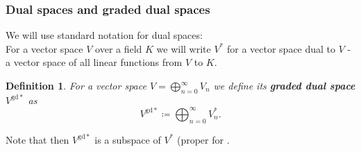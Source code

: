 \documentclass[a4paper, 12pt]{report}
\newtheorem{definition}{Definition}
\begin{document}
\subsubsection{Dual spaces and graded dual spaces }
We will use standard notation for dual spaces: \\ 
For a vector space $V$ over a field $K$ we will write $V^*$ for a vector space dual to $V$ - 
a vector space of all linear functions from $V$ to $K$. 
\begin{definition}\label{graded dual} For a vector space $V = \displaystyle\bigoplus^\infty_{n = 0} V_n$ we 
define its 
\textbf{graded dual space} $V^{\mathrm{gd}*}$ as
\begin{equation*}
V^{\mathrm{gd}*} \coloneqq \displaystyle\bigoplus^\infty_{n = 0} V_n^*.
\end{equation*}
\end{definition}
\noindent Note that then $V^{\mathrm{gd}*}$ is a subspace of $V^*$ (proper for .
\end{document}
